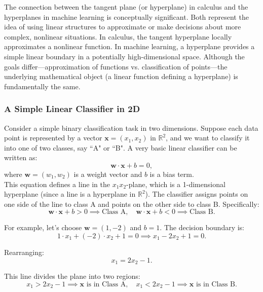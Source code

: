 \noindent The connection between the tangent plane (or hyperplane) in calculus and the hyperplanes in machine learning is conceptually significant. Both represent the idea of using linear structures to approximate or make decisions about more complex, nonlinear situations. In calculus, the tangent hyperplane locally approximates a nonlinear function. In machine learning, a hyperplane provides a simple linear boundary in a potentially high-dimensional space. Although the goals differ—approximation of functions vs. classification of points—the underlying mathematical object (a linear function defining a hyperplane) is fundamentally the same.

\subsubsection*{A Simple Linear Classifier in 2D} 

\noindent Consider a simple binary classification task in two dimensions. Suppose each data point is represented by a vector \(\mathbf{x} = (x_1, x_2)\) in \(\mathbb{R}^2\), and we want to classify it into one of two classes, say ``A" or ``B". A very basic linear classifier can be written as:
\[
\mathbf{w} \cdot \mathbf{x} + b = 0,
\]
where \(\mathbf{w} = (w_1, w_2)\) is a weight vector and \( b \) is a bias term. \\

\noindent This equation defines a line in the \( x_1x_2 \)-plane, which is a 1-dimensional hyperplane (since a line is a hyperplane in \(\mathbb{R}^2\)). The classifier assigns points on one side of the line to class A and points on the other side to class B. Specifically:
\[
\mathbf{w} \cdot \mathbf{x} + b > 0 \implies \text{Class A}, \quad \mathbf{w} \cdot \mathbf{x} + b < 0 \implies \text{Class B}.
\]

\noindent For example, let’s choose \( \mathbf{w} = (1, -2) \) and \( b = 1 \). The decision boundary is:
\[
1 \cdot x_1 + (-2) \cdot x_2 + 1 = 0 \implies x_1 - 2x_2 + 1 = 0.
\]

\noindent Rearranging:
\[
x_1 = 2x_2 - 1.
\]

\noindent This line divides the plane into two regions:
\[
x_1 > 2x_2 - 1 \implies \mathbf{x} \text{ is in Class A}, \quad x_1 < 2x_2 - 1 \implies \mathbf{x} \text{ is in Class B}.
\]

